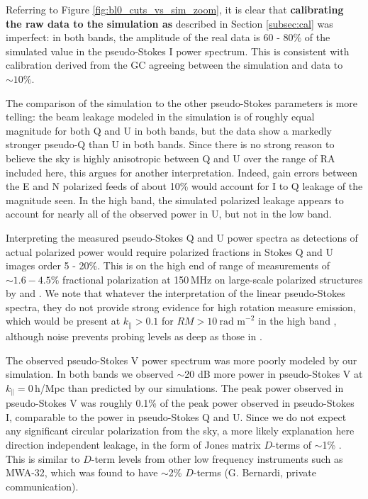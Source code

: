 \documentclass[twocolumn, trackchanges]{aastex61}
\newcommand{\edited}[1]{{\bf \color{blue} #1}}
\begin{document}
Referring to Figure \ref{fig:bl0_cuts_vs_sim_zoom}, it is clear that
\edited{calibrating the raw data to the simulation as} described in Section
\ref{subsec:cal} was imperfect: in both bands, the amplitude of the real data is
60 - 80\% of the simulated value in the pseudo-Stokes I power spectrum.  This is
consistent with calibration derived from the GC agreeing between the simulation
and data to $\sim10\%$.

The comparison of the simulation to the other pseudo-Stokes parameters is more
telling: the beam leakage modeled in the simulation is of roughly equal
magnitude for both Q and U in both bands, but the data show a markedly stronger
pseudo-Q than U in both bands.  Since there is no strong reason to believe the
sky is highly anisotropic between Q and U over the range of RA included here,
this argues for another interpretation.  Indeed, gain errors between the E and N
polarized feeds of about 10\% would account for I to Q leakage of the magnitude
seen.  In the high band, the simulated polarized leakage appears to account for
nearly all of the observed power in U, but not in the low band.

Interpreting the measured pseudo-Stokes Q and U power spectra as detections of
actual polarized power would require polarized fractions in Stokes Q and U
images order 5 - 20\%.  This is on the high end of range of measurements of
$\sim 1.6 - 4.5\%$ fractional polarization at 150\,MHz on large-scale polarized
structures by \cite{Jelic.15} and \cite{Lenc.16}.  We note that whatever the
interpretation of the linear pseudo-Stokes spectra, they do not provide strong
evidence for high rotation measure emission, which would be present at
$k_\parallel > 0.1$ for $RM > 10~\text{rad m}^{-2}$ in the high band
\cite{Moore17}, although noise prevents probing levels as deep as those in
\cite{Asad18}.

The observed pseudo-Stokes V power spectrum was more poorly modeled by our
simulation. In both bands we observed $\sim$20 dB more power in pseudo-Stokes V
at $k_{\parallel}=0$\,h/Mpc than predicted by our simulations. The peak power
observed in pseudo-Stokes V was roughly 0.1\% of the peak power observed in
pseudo-Stokes I, comparable to the power in pseudo-Stokes Q and U.  Since we do
not expect any significant circular polarization from the sky, a more likely
explanation here direction independent leakage, in the form of Jones matrix
$D$-terms of $\sim$1\% \citep{TMS}. This is similar to $D$-term levels from
other low frequency instruments such as MWA-32, which was found to have
$\sim$2\% $D$-terms (G. Bernardi, private communication).
\end{document}
